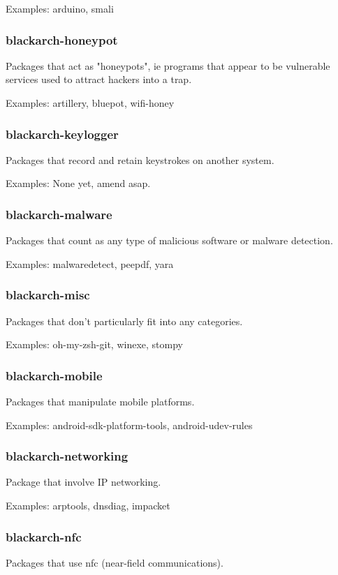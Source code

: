 \documentclass[a4paper, oneside, 11pt]{book}
\begin{document}
Examples: arduino, smali

\subsubsection{blackarch-honeypot}
Packages that act as "honeypots", ie programs that appear to
be vulnerable services used to attract hackers into a trap.

Examples: artillery, bluepot, wifi-honey

\subsubsection{blackarch-keylogger}
Packages that record and retain keystrokes on another system.

Examples: None yet, amend asap.

\subsubsection{blackarch-malware}
Packages that count as any type of malicious software or
malware detection.

Examples: malwaredetect, peepdf, yara

\subsubsection{blackarch-misc}
Packages that don't particularly fit into any categories.

Examples: oh-my-zsh-git, winexe, stompy

\subsubsection{blackarch-mobile}
Packages that manipulate mobile platforms.

Examples: android-sdk-platform-tools, android-udev-rules

\subsubsection{blackarch-networking}
Package that involve IP networking.

Examples: arptools, dnsdiag, impacket

\subsubsection{blackarch-nfc}
Packages that use nfc (near-field communications).
\end{document}

